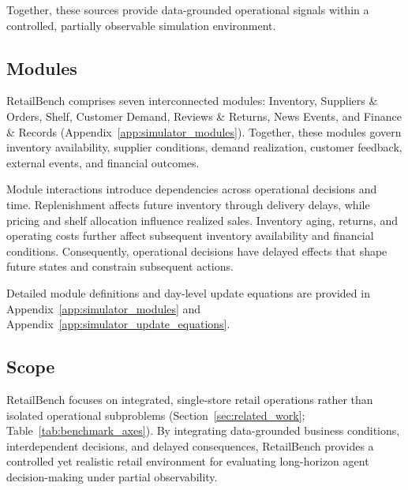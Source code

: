 Together, these sources provide data-grounded operational signals
within a controlled, partially observable simulation environment.


\subsection{Modules}
\label{sec:module_logic}

RetailBench comprises seven interconnected modules: Inventory,
Suppliers \& Orders, Shelf, Customer Demand, Reviews \& Returns,
News Events, and Finance \& Records
(Appendix~\ref{app:simulator_modules}).
Together, these modules govern inventory availability, supplier
conditions, demand realization, customer feedback, external events,
and financial outcomes.

Module interactions introduce dependencies across operational decisions
and time. Replenishment affects future inventory through delivery
delays, while pricing and shelf allocation influence realized sales.
Inventory aging, returns, and operating costs further affect
subsequent inventory availability and financial conditions.
Consequently, operational decisions have delayed effects that
shape future states and constrain subsequent actions.

Detailed module definitions and day-level update equations are
provided in Appendix~\ref{app:simulator_modules}
and Appendix~\ref{app:simulator_update_equations}.


\subsection{Scope}

RetailBench focuses on integrated, single-store retail operations
rather than isolated operational subproblems
(Section~\ref{sec:related_work}; Table~\ref{tab:benchmark_axes}).
By integrating data-grounded business conditions, interdependent decisions, and delayed consequences, RetailBench provides a controlled yet realistic retail environment for evaluating long-horizon agent decision-making under partial observability.